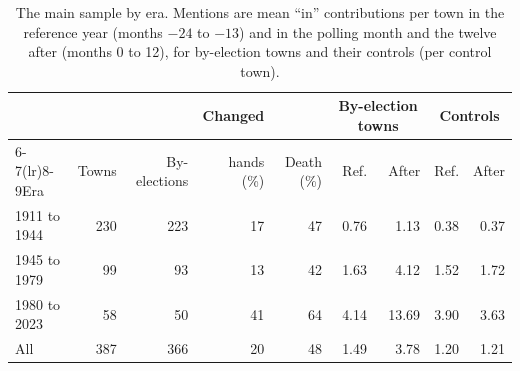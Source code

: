 \documentclass[11pt,a4paper]{article}
\begin{document}
\begin{table}[tbp]\centering\small\caption{The main sample by era. Mentions are mean ``in'' contributions per town in the reference year (months $-24$ to $-13$) and in the polling month and the twelve after (months 0 to 12), for by-election towns and their controls (per control town).}\label{tab:desc}\setlength{\tabcolsep}{4pt}\begin{tabular}{lrrrrrrrr}\toprule & & & Changed & & \multicolumn{2}{c}{By-election towns} & \multicolumn{2}{c}{Controls}\\\cmidrule(lr){6-7}\cmidrule(lr){8-9}Era & Towns & By-elections & hands (\%) & Death (\%) & Ref. & After & Ref. & After\\\midrule
1911 to 1944 & 230 & 223 & 17 & 47 & 0.76 & 1.13 & 0.38 & 0.37\\
1945 to 1979 & 99 & 93 & 13 & 42 & 1.63 & 4.12 & 1.52 & 1.72\\
1980 to 2023 & 58 & 50 & 41 & 64 & 4.14 & 13.69 & 3.90 & 3.63\\
\midrule
All & 387 & 366 & 20 & 48 & 1.49 & 3.78 & 1.20 & 1.21\\
\bottomrule\end{tabular}\end{table}
\end{document}
